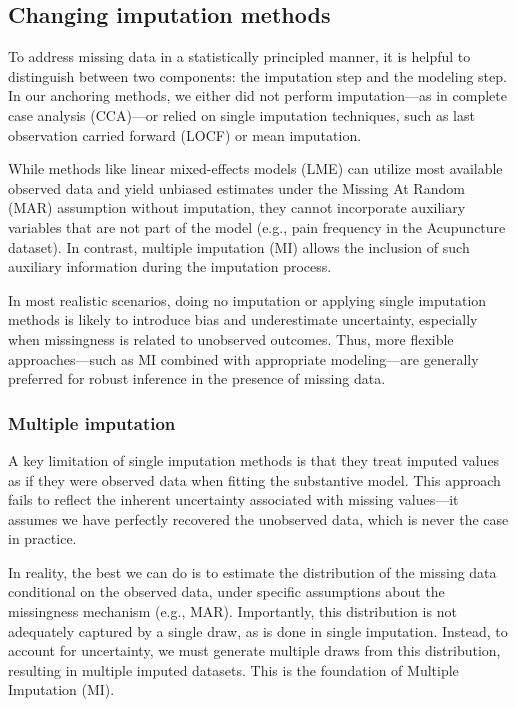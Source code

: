 \documentclass{article}
\begin{document}
\subsection{Changing imputation
methods}\label{changing-imputation-methods}

To address missing data in a statistically principled manner, it is
helpful to distinguish between two components: the imputation step and
the modeling step. In our anchoring methods, we either did not perform
imputation---as in complete case analysis (CCA)---or relied on single
imputation techniques, such as last observation carried forward (LOCF)
or mean imputation.

While methods like linear mixed-effects models (LME) can utilize most
available observed data and yield unbiased estimates under the Missing
At Random (MAR) assumption without imputation, they cannot incorporate
auxiliary variables that are not part of the model (e.g., pain frequency
in the Acupuncture dataset). In contrast, multiple imputation (MI)
allows the inclusion of such auxiliary information during the imputation
process.

In most realistic scenarios, doing no imputation or applying single
imputation methods is likely to introduce bias and underestimate
uncertainty, especially when missingness is related to unobserved
outcomes. Thus, more flexible approaches---such as MI combined with
appropriate modeling---are generally preferred for robust inference in
the presence of missing data.

\subsubsection{Multiple imputation}\label{multiple-imputation}

A key limitation of single imputation methods is that they treat imputed
values as if they were observed data when fitting the substantive model.
This approach fails to reflect the inherent uncertainty associated with
missing values---it assumes we have perfectly recovered the unobserved
data, which is never the case in practice.

In reality, the best we can do is to estimate the distribution of the
missing data conditional on the observed data, under specific
assumptions about the missingness mechanism (e.g., MAR). Importantly,
this distribution is not adequately captured by a single draw, as is
done in single imputation. Instead, to account for uncertainty, we must
generate multiple draws from this distribution, resulting in multiple
imputed datasets. This is the foundation of Multiple Imputation (MI).
\end{document}
